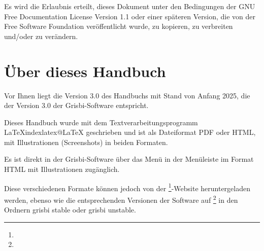 Es wird die Erlaubnis erteilt, dieses Dokument unter den Bedingungen der GNU Free Documentation License Version 1.1 oder einer späteren Version, die von der \gls{Free Software Foundation} veröffentlicht wurde, zu kopieren, zu verbreiten und/oder zu verändern.

\section{Über dieses Handbuch\label{introduction-manual}}


Vor Ihnen liegt die Version 3.0 des Handbuchs mit Stand von \actuality{}Anfang 2025, die der Version 3.0 der Grisbi-Software entspricht.




Dieses Handbuch wurde mit dem Textverarbeitungsprogramm \gls{LaTeX}index{latex@LaTeX} geschrieben und ist als \gls{Dateiformat} \gls{PDF} oder \gls{HTML}, mit Illustrationen (Screenshots) in beiden Formaten.

Es ist direkt in der Grisbi-Software über das Menü  in der Menüleiste im Format \gls{HTML} mit Illustrationen zugänglich.

Diese verschiedenen Formate können jedoch von der \footnote{\urlSourceForgeDocumentation{}}-Website heruntergeladen werden, ebenso wie die entsprechenden Versionen der Software auf \footnote{\urlSourceForge{}} in den Ordnern \glqq{}\textsf{grisbi stable}\grqq{} oder \glqq{}\textsf{grisbi unstable}\grqq{}.

